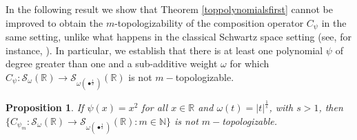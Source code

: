 \documentclass[12pt,reqno]{amsart} %
\newtheorem{prop}[theorem]{Proposition}
\numberwithin{equation}{section}
\begin{document}
In the following result we show that Theorem \ref{toppolynomialsfirst} cannot be improved to obtain the $m$-topologizability of the composition operator $C_\psi$ in the same setting, unlike what happens in the classical Schwartz space setting (see, for instance, \cite[Example 4.14.]{akj}). In particular, we establish that there is at least one polynomial $\psi$ of degree greater than one and a sub-additive weight $\omega$ for which $C_\psi: \mathcal{S}_{\omega}(\mathbb{R})\to \mathcal{S}_{\omega(\bullet^{\frac{1}{2}})}(\mathbb{R})$ is not $m-$topologizable.

\begin{prop}\label{squaremtop}
If $\psi(x)=x^2$ for all $x\in\mathbb{R}$ and $\omega(t)=|t|^{\frac{1}{s}}$, with $s>1$, then $\{C_{\psi_m}:\mathcal{S}_{\omega}(\mathbb{R})\to \mathcal{S}_{\omega(\bullet^{\frac{1}{2}})}(\mathbb{R}):m\in\mathbb{N}\}$ is not $m-$topologizable.
\end{prop}
\end{document}
